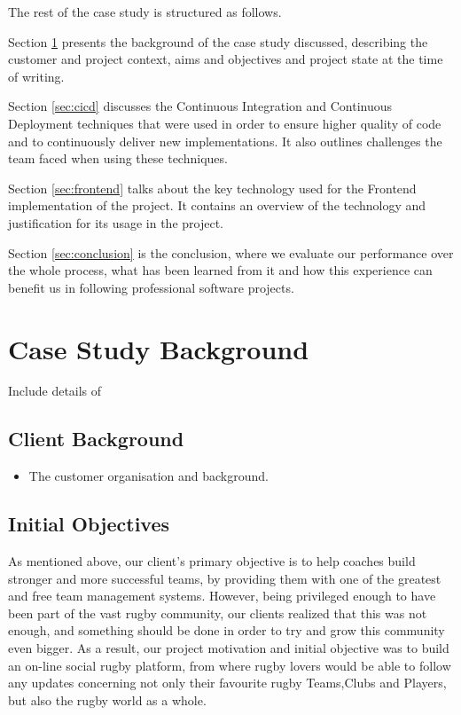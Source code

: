 \documentclass{l3proj}
\begin{document}
The rest of the case study is structured as follows.

Section \ref{sec:background} presents the background of the case study discussed, describing the customer and project context, aims and objectives and project state at the time of writing.

Section \ref{sec:cicd} discusses the Continuous Integration and Continuous Deployment techniques that were used in order to ensure higher quality of code and to continuously deliver new implementations. It also outlines challenges the team faced when using these techniques.

Section \ref{sec:frontend} talks about the key technology used for the Frontend implementation of the project. It contains an overview of the technology and justification for its usage in the project.

Section \ref{sec:conclusion} is the conclusion, where we evaluate our performance over the whole process, what has been learned from it and how this experience can benefit us in following professional software projects.


\section{Case Study Background}
\label{sec:background}
Include details of

\subsection{Client Background}
\begin{itemize}
\item The customer organisation and background.
\end{itemize}

\subsection{Initial Objectives}
As mentioned above, our client's primary objective is to help coaches build
stronger and more successful teams, by providing them with one of the greatest
and free team management systems. However, being privileged enough to have been
part of the vast rugby community, our clients realized that this was not enough,
and something should be done in order to try and grow this community even bigger.
As a result, our project motivation and initial objective was to build an on-line
social rugby platform, from where rugby lovers would be able to follow any
updates concerning not only their favourite rugby Teams,Clubs and Players, but also
the rugby world as a whole.
\end{document}
